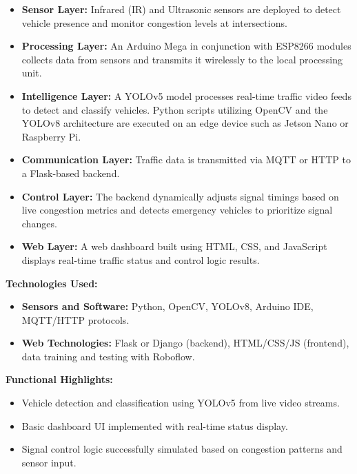 \begin{itemize}
    \item \textbf{Sensor Layer:} Infrared (IR) and Ultrasonic sensors are deployed to detect vehicle presence and monitor congestion levels at intersections.
    
    \item \textbf{Processing Layer:} An Arduino Mega in conjunction with ESP8266 modules collects data from sensors and transmits it wirelessly to the local processing unit.
    
    \item \textbf{Intelligence Layer:} A YOLOv5 model processes real-time traffic video feeds to detect and classify vehicles. Python scripts utilizing OpenCV and the YOLOv8 architecture are executed on an edge device such as Jetson Nano or Raspberry Pi.
    
    \item \textbf{Communication Layer:} Traffic data is transmitted via MQTT or HTTP to a Flask-based backend.
    
    \item \textbf{Control Layer:} The backend dynamically adjusts signal timings based on live congestion metrics and detects emergency vehicles to prioritize signal changes.
    
    \item \textbf{Web Layer:} A web dashboard built using HTML, CSS, and JavaScript displays real-time traffic status and control logic results. 
\end{itemize}

\vspace{0.3cm}

\textbf{Technologies Used:}
\begin{itemize}
    \item \textbf{Sensors and Software:} Python, OpenCV, YOLOv8, Arduino IDE, MQTT/HTTP protocols.
    \item \textbf{Web Technologies:} Flask or Django (backend), HTML/CSS/JS (frontend), data training and testing with Roboflow.
\end{itemize}

\vspace{0.3cm}

\textbf{Functional Highlights:}
\begin{itemize}
    \item Vehicle detection and classification using YOLOv5 from live video streams.
    \item Basic dashboard UI implemented with real-time status display.
    \item Signal control logic successfully simulated based on congestion patterns and sensor input.
\end{itemize}

